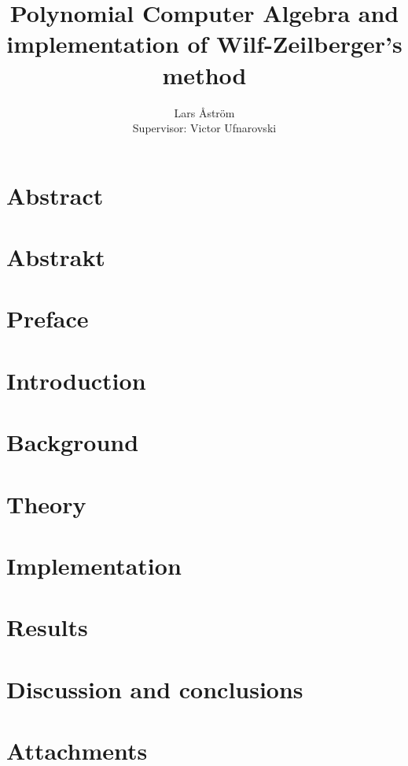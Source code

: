 \documentclass{LTHthesis}
\theoremstyle{definition}
\begin{document}
\begin{titlepages}
\author{Lars Åström\\Supervisor: Victor Ufnarovski}
\title{Polynomial Computer Algebra and implementation of Wilf-Zeilberger's method}
\end{titlepages}
\chapter*{Abstract}


\chapter*{Abstrakt}


\chapter*{Preface}


\tableofcontents

\chapter{Introduction}\label{Ch: Introduction}


\chapter{Background}\label{Ch: Background}


\chapter{Theory}\label{Ch: Theory}


\chapter{Implementation}\label{Ch: Implementation}


\chapter{Results}\label{Ch: Results}


\chapter{Discussion and conclusions}\label{Ch: Discussion and conclusions}


\begin{thebibliography}{99}

\end{thebibliography}

\chapter{Attachments}\label{Ch: Attachments}

\end{document}
